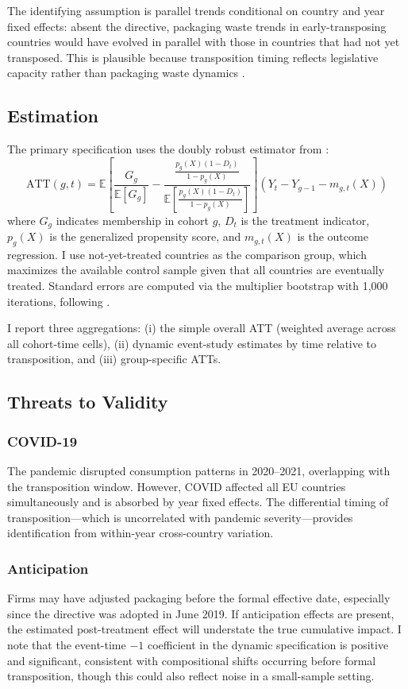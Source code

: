\documentclass[12pt]{article}
\newcommand{\E}{\mathbb{E}}
\begin{document}
The identifying assumption is parallel trends conditional on country and year fixed effects: absent the directive, packaging waste trends in early-transposing countries would have evolved in parallel with those in countries that had not yet transposed. This is plausible because transposition timing reflects legislative capacity rather than packaging waste dynamics \citep{thomson2007time}.

\subsection{Estimation}

The primary specification uses the doubly robust estimator from \citet{callaway2021difference}:
\begin{equation}
\text{ATT}(g,t) = \E\left[\frac{G_g}{\E[G_g]} - \frac{\frac{p_g(X)(1-D_t)}{1-p_g(X)}}{\E\left[\frac{p_g(X)(1-D_t)}{1-p_g(X)}\right]}\right] (Y_t - Y_{g-1} - m_{g,t}(X))
\end{equation}
where $G_g$ indicates membership in cohort $g$, $D_t$ is the treatment indicator, $p_g(X)$ is the generalized propensity score, and $m_{g,t}(X)$ is the outcome regression. I use not-yet-treated countries as the comparison group, which maximizes the available control sample given that all countries are eventually treated. Standard errors are computed via the multiplier bootstrap with 1,000 iterations, following \citet{callaway2021difference}.

I report three aggregations: (i) the simple overall ATT (weighted average across all cohort-time cells), (ii) dynamic event-study estimates by time relative to transposition, and (iii) group-specific ATTs.

\subsection{Threats to Validity}

\subsubsection*{COVID-19} The pandemic disrupted consumption patterns in 2020--2021, overlapping with the transposition window. However, COVID affected all EU countries simultaneously and is absorbed by year fixed effects. The differential timing of transposition---which is uncorrelated with pandemic severity---provides identification from within-year cross-country variation.

\subsubsection*{Anticipation} Firms may have adjusted packaging before the formal effective date, especially since the directive was adopted in June 2019. If anticipation effects are present, the estimated post-treatment effect will understate the true cumulative impact. I note that the event-time $-1$ coefficient in the dynamic specification is positive and significant, consistent with compositional shifts occurring before formal transposition, though this could also reflect noise in a small-sample setting.
\end{document}
